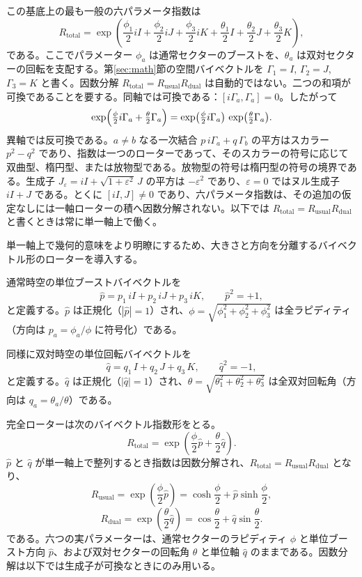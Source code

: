 \documentclass[a4paper]{article}
\begin{document}
この基底上の最も一般の六パラメータ指数は
\[
R_\text{total} = \exp\left( \frac{\phi_1}{2} iI + \frac{\phi_2}{2} iJ + \frac{\phi_3}{2} iK + \frac{\theta_1}{2} I + \frac{\theta_2}{2} J + \frac{\theta_3}{2} K \right),
\]
である。ここでパラメーター $\phi_a$ は通常セクターのブーストを、$\theta_a$ は双対セクターの回転を支配する。第\ref{sec:math}節の空間バイベクトルを $\Gamma_1=I$, $\Gamma_2=J$, $\Gamma_3=K$ と書く。因数分解 $R_{\mathrm{total}}=R_{\mathrm{usual}}R_{\mathrm{dual}}$ は自動的ではない。二つの和項が可換であることを要する。同軸では可換である：$[i\Gamma_a,\Gamma_a]=0$。したがって
\[
\exp\Bigl(\tfrac{\phi}{2}i\Gamma_a+\tfrac{\theta}{2}\Gamma_a\Bigr)
=\exp\bigl(\tfrac{\phi}{2}i\Gamma_a\bigr)\,\exp\bigl(\tfrac{\theta}{2}\Gamma_a\bigr).
\]
異軸では反可換である。$a\neq b$ なる一次結合 $p\,i\Gamma_a+q\,\Gamma_b$ の平方はスカラー $p^2-q^2$ であり、指数は一つのローターであって、そのスカラーの符号に応じて双曲型、楕円型、または放物型である。放物型の符号は楕円型の符号の境界である。生成子 $J_\varepsilon=iI+\sqrt{1+\varepsilon^2}\,J$ の平方は $-\varepsilon^2$ であり、$\varepsilon=0$ ではヌル生成子 $iI+J$ である。とくに $[iI,J]\neq 0$ であり、六パラメータ指数は、その追加の仮定なしには一軸ローターの積へ因数分解されない。以下では $R_{\mathrm{total}}=R_{\mathrm{usual}}R_{\mathrm{dual}}$ と書くときは常に単一軸上で働く。

単一軸上で幾何的意味をより明瞭にするため、大きさと方向を分離するバイベクトル形のローターを導入する。

通常時空の単位ブーストバイベクトルを
\[
\hat{p} = p_1 \, iI + p_2 \, iJ + p_3 \, iK, \qquad \hat{p}^2 = +1,
\]
と定義する。$\hat{p}$ は正規化（$|\hat{p}| = 1$）され、$\phi = \sqrt{\phi_1^2 + \phi_2^2 + \phi_3^2}$ は全ラピディティ（方向は $p_a = \phi_a / \phi$ に符号化）である。

同様に双対時空の単位回転バイベクトルを
\[
\hat{q} = q_1 \, I + q_2 \, J + q_3 \, K, \qquad \hat{q}^2 = -1,
\]
と定義する。$\hat{q}$ は正規化（$|\hat{q}| = 1$）され、$\theta = \sqrt{\theta_1^2 + \theta_2^2 + \theta_3^2}$ は全双対回転角（方向は $q_a = \theta_a / \theta$）である。

完全ローターは次のバイベクトル指数形をとる。
\[
R_\text{total} = \exp\!\left( \frac{\phi}{2} \hat{p} + \frac{\theta}{2} \hat{q} \right).
\]
$\hat{p}$ と $\hat{q}$ が単一軸上で整列するとき指数は因数分解され、$R_{\mathrm{total}}=R_{\mathrm{usual}}R_{\mathrm{dual}}$ となり、
\[
R_\text{usual} = \exp\!\left( \frac{\phi}{2} \hat{p} \right)
= \cosh\frac{\phi}{2} + \hat{p} \sinh\frac{\phi}{2},
\]
\[
R_\text{dual} = \exp\!\left( \frac{\theta}{2} \hat{q} \right)
= \cos\frac{\theta}{2} + \hat{q} \sin\frac{\theta}{2}.
\]
である。六つの実パラメーターは、通常セクターのラピディティ $\phi$ と単位ブースト方向 $\hat{p}$、および双対セクターの回転角 $\theta$ と単位軸 $\hat{q}$ のままである。因数分解は以下では生成子が可換なときにのみ用いる。
\end{document}
